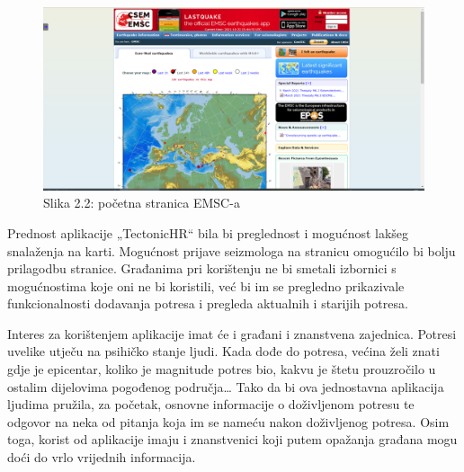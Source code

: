\begin{figure}[H]
			\includegraphics[width=\textwidth]{slike/emsc1.PNG} %
			\caption{Slika 2.2: početna stranica EMSC-a}
			\label{fig:promjene2} %
		\end{figure}

{Prednost aplikacije „TectonicHR“ bila bi preglednost i mogućnost lakšeg snalaženja na karti. 
Mogućnost prijave seizmologa na stranicu omogućilo bi bolju prilagodbu stranice. Građanima pri korištenju ne bi smetali izbornici s mogućnostima koje oni ne bi koristili, već bi im se pregledno prikazivale funkcionalnosti dodavanja potresa i pregleda aktualnih i starijih potresa. }

{Interes za korištenjem aplikacije imat će i građani i znanstvena zajednica. Potresi uvelike utječu na psihičko stanje ljudi. 
Kada dođe do potresa, većina želi znati gdje je epicentar, koliko je magnitude potres bio, kakvu je štetu prouzročilo u ostalim dijelovima pogođenog područja… 
Tako da bi ova jednostavna aplikacija ljudima pružila, za početak, osnovne informacije o doživljenom potresu te odgovor na neka od pitanja koja im se nameću nakon doživljenog potresa. 
Osim toga, korist od aplikacije imaju i znanstvenici koji putem opažanja građana mogu doći do vrlo vrijednih informacija. }\\		
		
\eject
		
	